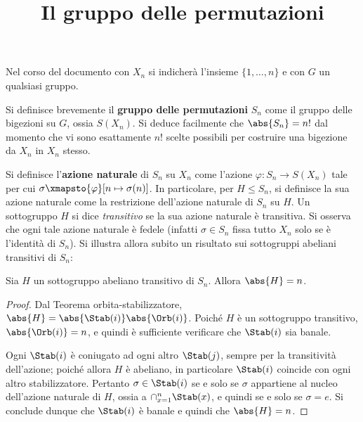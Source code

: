 \documentclass[12pt]{scrartcl}
\begin{document}
	\title{Il gruppo delle permutazioni}
	\maketitle
	
	\begin{note}
		Nel corso del documento con $X_n$ si indicherà l'insieme
		$\{1, \ldots, n\}$ e con $G$ un qualsiasi gruppo.
	\end{note}

	Si definisce brevemente il \textbf{gruppo delle permutazioni} $S_n$ come il gruppo
	delle bigezioni su $G$, ossia $S(X_n)$. Si deduce facilmente che
	$\abs{S_n} = n!$ dal momento che vi sono esattamente $n!$ scelte possibili
	per costruire una bigezione da $X_n$ in $X_n$ stesso. \medskip
	
	
	Si definisce
	l'\textbf{azione naturale} di $S_n$ su $X_n$ come l'azione $\varphi : S_n \to S(X_n)$
	tale per cui $\sigma \xmapsto{\varphi} [n \mapsto \sigma(n)]$. In particolare,
	per $H \leq S_n$, si definisce la sua azione naturale come la restrizione dell'azione
	naturale di $S_n$ su $H$. Un sottogruppo $H$ si dice \textit{transitivo} se la
	sua azione naturale è transitiva. Si osserva che ogni tale azione naturale è fedele
	(infatti $\sigma \in S_n$ fissa tutto $X_n$ solo se è l'identità di $S_n$). Si illustra allora subito un risultato sui
	sottogruppi abeliani transitivi di $S_n$:
	
	\begin{proposition}
		Sia $H$ un sottogruppo abeliano transitivo di $S_n$. Allora
		$\abs{H} = n$.
	\end{proposition}
	
	\begin{proof}
		Dal Teorema orbita-stabilizzatore, $\abs{H} = \abs{\Stab(i)} \abs{\Orb(i)}$. Poiché
		$H$ è un sottogruppo transitivo, $\abs{\Orb(i)} = n$, e quindi è sufficiente
		verificare che $\Stab(i)$ sia banale. \medskip
		
		
		Ogni $\Stab(i)$ è coniugato
		ad ogni altro $\Stab(j)$, sempre per la transitività dell'azione; poiché allora $H$ è abeliano, in particolare $\Stab(i)$ coincide con
		ogni altro stabilizzatore. Pertanto $\sigma \in \Stab(i)$ se e solo se
		$\sigma$ appartiene al nucleo dell'azione naturale di $H$, ossia
		a $\cap_{x=1}^n \Stab(x)$, e quindi se e solo se $\sigma = e$. Si conclude dunque
		che $\Stab(i)$ è banale e quindi che $\abs{H} = n$.
	\end{proof}
	
\end{document}
